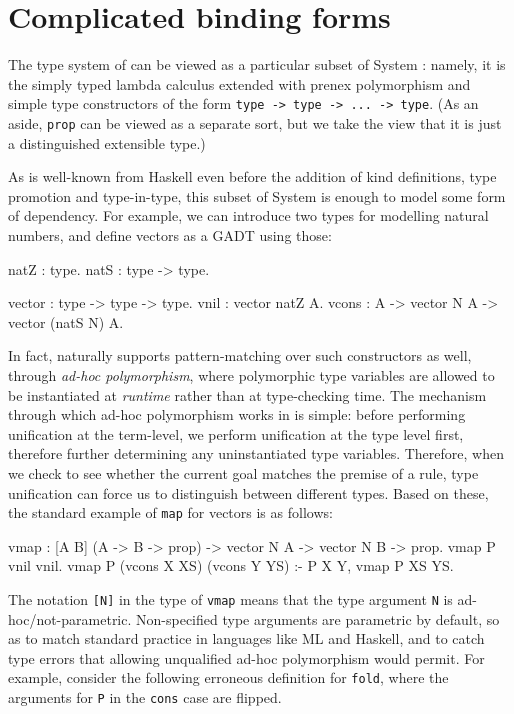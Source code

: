 \documentclass[format=acmlarge,review,anonymous]{acmart}\settopmatter{printfolios=true}
\begin{document}

\section{Complicated binding forms}

The type system of \lamprolog can be viewed as a particular subset of System \fomega: namely, it is the
simply typed lambda calculus extended with prenex polymorphism and simple type constructors of the
form \texttt{type -> type -> ... -> type}. (As an aside, \texttt{prop} can be viewed as a separate
sort, but we take the view that it is just a distinguished extensible type.)

As is well-known from Haskell even before the addition of kind definitions, type promotion and
type-in-type, this subset of System \fomega is enough to model some form of dependency. For example, we
can introduce two types for modelling natural numbers, and define vectors as a GADT using those:

\begin{codequote}
natZ : type.
natS : type -> type.

vector : type -> type -> type.
vnil : vector natZ A.
vcons : A -> vector N A -> vector (natS N) A.
\end{codequote}

In fact, \lamprolog naturally supports pattern-matching over such constructors as well, through
\emph{ad-hoc polymorphism}, where polymorphic type variables are allowed to be instantiated at
\emph{runtime} rather than at type-checking time. The mechanism through which ad-hoc polymorphism
works in \lamprolog is simple: before performing unification at the term-level, we perform unification
at the type level first, therefore further determining any uninstantiated type variables.
Therefore, when we check to see whether the current goal matches the premise of a rule, type
unification can force us to distinguish between different types. Based on these, the standard
example of \texttt{map} for vectors is as follows:

\begin{codequote}
vmap : [A B] (A -> B -> prop) -> vector N A -> vector N B -> prop.
vmap P vnil vnil.
vmap P (vcons X XS) (vcons Y YS) :- P X Y, vmap P XS YS.
\end{codequote}

The notation \texttt{{[}N{]}} in the type of \texttt{vmap} means that the type argument \texttt{N}
is ad-hoc/not-parametric. Non-specified type arguments are parametric by default, so as to match
standard practice in languages like ML and Haskell, and to catch type errors that allowing
unqualified ad-hoc polymorphism would permit. For example, consider the following erroneous
definition for \texttt{fold}, where the arguments for \texttt{P} in the \texttt{cons} case are
flipped.
\end{document}
